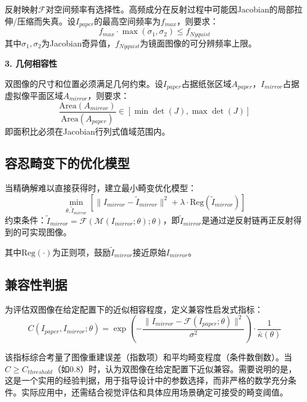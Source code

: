 \documentclass[withoutpreface]{cumcmthesis}
\begin{document}
反射映射$\mathcal{F}$对空间频率有选择性。高频成分在反射过程中可能因Jacobian的局部拉伸/压缩而失真。设$I_{paper}$的最高空间频率为$f_{max}$，则要求：
\begin{equation}
f_{max} \cdot \max(\sigma_1, \sigma_2) \leq f_{Nyquist}
\end{equation}
其中$\sigma_1,\sigma_2$为Jacobian奇异值，$f_{Nyquist}$为镜面图像的可分辨频率上限。

\textbf{3. 几何相容性}

双图像的尺寸和位置必须满足几何约束。设$I_{paper}$占据纸张区域$A_{paper}$，$I_{mirror}$占据虚拟像平面区域$A_{mirror}$，则要求：
\begin{equation}
\frac{\text{Area}(A_{mirror})}{\text{Area}(A_{paper})} \in [\min\det(J), \max\det(J)]
\end{equation}
即面积比必须在Jacobian行列式值域范围内。

\subsection{容忍畸变下的优化模型}

当精确解难以直接获得时，建立最小畸变优化模型：
\begin{equation}
\min_{\theta, \tilde{I}_{mirror}} \left[\|I_{mirror} - \tilde{I}_{mirror}\|^2 + \lambda\cdot\text{Reg}(\tilde{I}_{mirror})\right]
\end{equation}
约束条件：$\tilde{I}_{mirror} = \mathcal{F}(\mathcal{M}(I_{mirror}; \theta); \theta)$，即$\tilde{I}_{mirror}$是通过逆反射链再正反射得到的可实现图像。

其中$\text{Reg}(\cdot)$为正则项，鼓励$\tilde{I}_{mirror}$接近原始$I_{mirror}$。

\subsection{兼容性判据}

为评估双图像在给定配置下的近似相容程度，定义兼容性启发式指标：
\begin{equation}
C(I_{paper}, I_{mirror}; \theta) = \exp\left(-\frac{\|I_{mirror} - \mathcal{F}(I_{paper};\theta)\|^2}{\sigma^2}\right) \cdot \frac{1}{\bar{\kappa}(\theta)}
\end{equation}

该指标综合考量了图像重建误差（指数项）和平均畸变程度（条件数倒数）。当$C \geq C_{threshold}$（如0.8）时，认为双图像在给定配置下近似兼容。需要说明的是，这是一个实用的经验判据，用于指导设计中的参数选择，而非严格的数学充分条件。实际应用中，还需结合视觉评估和具体应用场景确定可接受的畸变阈值。
\end{document}
